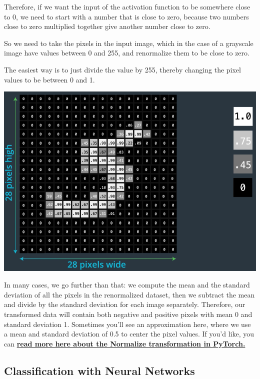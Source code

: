Therefore, if we want the input of the activation function to be somewhere close to 0, we need to start with a number that is close to zero, because two numbers close to zero multiplied together give another number close to zero. \newline

So we need to take the pixels in the input image, which in the case of a grayscale image have values between 0 and 255, and renormalize them to be close to zero. \newline

The easiest way is to just divide the value by 255, thereby changing the pixel values to be between 0 and 1.

\includegraphics[width=1\linewidth]{img//cnn/image-normalized.png}

In many cases, we go further than that: we compute the mean and the standard deviation of all the pixels in the renormalized dataset, then we subtract the mean and divide by the standard deviation for each image separately. Therefore, our transformed data will contain both negative and positive pixels with mean 0 and standard deviation 1. Sometimes you'll see an approximation here, where we use a mean and standard deviation of 0.5 to center the pixel values. If you'd like, you can \href{https://pytorch.org/docs/stable/}{\textbf{read more here about the Normalize transformation in PyTorch.}}


\subsection{Classification with Neural Networks}

